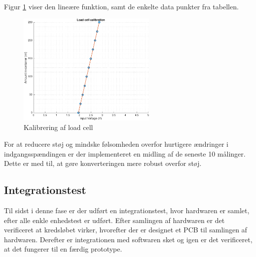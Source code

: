Figur \ref{fig:loadcellcalib} viser den lineære funktion, samt de enkelte data punkter fra tabellen. 
\begin{figure}[H]
	\centering
	\includegraphics[width=0.6\textwidth]{billeder/software/calibration-crop.pdf}
	\caption{Kalibrering af load cell}
	\label{fig:loadcellcalib}
\end{figure}

For at reducere støj og mindske følsomheden overfor hurtigere ændringer i indgangsspændingen er der implementeret en midling af de seneste 10 målinger. Dette er med til, at gøre konverteringen mere robust overfor støj. 


\subsection{Integrationstest}
Til sidst i denne fase er der udført en integrationstest, hvor hardwaren er samlet, efter alle enkle enhedstest er udført. Efter samlingen af hardwaren er det verificeret at kredsløbet virker, hvorefter der er designet et PCB til samlingen af hardwaren. Derefter er integrationen med softwaren sket og igen er det verificeret, at det fungerer til en færdig prototype. 

